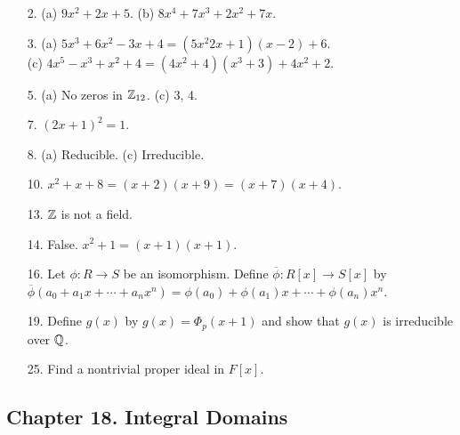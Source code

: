 {\small
\begin{itemize}
 
\item[2.]
(a) $9 x^2 + 2 x + 5$.
(b) $8 x^4 + 7 x^3 + 2 x^2 + 7 x$.
 
\item[3.]
(a) $5 x^3 + 6 x^2 - 3 x + 4 = (5 x^2 2x + 1)(x -2) + 6$. \\
(c) $4x^5 - x^3 + x^2 + 4 = (4x^2 + 4)(x^3 + 3) + 4x^2 + 2$.
 
\item[5.]
(a) No zeros in ${\Bbb Z}_{12}$.
(c) 3, 4.
 
\item[7.]
$(2x+1)^2 = 1$.
 
 
\item[8.]
(a) Reducible.
(c) Irreducible.
 
 
\item[10.]
$x^2 + x + 8 = (x+2)(x+9) = (x+7)(x+4)$.
 
 
\item[13.]
${\Bbb Z}$ is not a field.
 
\item[14.]
False. $x^2 + 1 = (x+1)(x+1)$. 
 
\item[16.]
Let $\phi : R \rightarrow S$ be an isomorphism.  Define
$\overline{\phi} : R[x] \rightarrow S[x]$ by $\overline{\phi}(a_0 +
a_1 x + \cdots + a_n x^n) = \phi(a_0) + \phi(a_1) x + \cdots +
\phi(a_n) x^n$.
 

\item[19.]
Define $g(x)$ by  $g(x) = \Phi_p(x + 1)$ and show that $g(x)$ is
irreducible over ${\Bbb Q}$.


\item[25.]
Find a nontrivial proper ideal in $F[x]$.


\end{itemize}
}
 
\subsection*{Chapter 18. Integral Domains}
 
